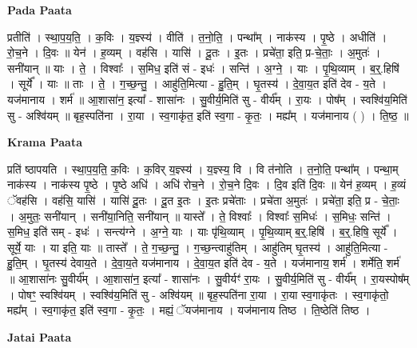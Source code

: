 \documentclass[17pt]{extarticle}
\begin{document}
\textbf{Pada Paata} \newline

प्रतीति॑ । स्था॒प॒य॒ति॒ । क॒विः । य॒ज्ञ्स्य॑ । वीति॑ । त॒नो॒ति॒ । पन्था᳚म् । नाक॑स्य । पृ॒ष्ठे । अधीति॑ । रो॒च॒ने । दि॒वः ॥ येन॑ । ह॒व्यम् । वह॑सि । यासि॑ । दू॒तः । इ॒तः । प्रचे॑ता॒ इति॒ प्र-चे॒ताः॒ । अ॒मुतः॑ । सनी॑यान् ॥ याः । ते॒ । विश्वाः᳚ । स॒मिध॒ इति॑ सं - इधः॑ । सन्ति॑ । अ॒ग्ने॒ । याः । पृ॒थि॒व्याम् । ब॒र्॒.हिषि॑ । सूर्ये᳚ । याः ॥ ताः । ते॒ । ग॒च्छ॒न्तु॒ । आहु॑ति॒मित्या - हु॒ति॒म् । घृ॒तस्य॑ । दे॒वा॒य॒त इति॑ देव - य॒ते । यज॑मानाय । शर्म॑ ॥ आ॒शासा॑न॒ इत्या᳚ - शासा॑नः । सु॒वीर्य॒मिति॑ सु - वीर्य᳚म् । रा॒यः । पोष᳚म् । स्वश्वि॑य॒मिति॑ सु - अश्वि॑यम् ॥ बृह॒स्पति॑ना । रा॒या । स्व॒गाकृ॑त॒ इति॑ स्व॒गा - कृ॒तः॒ । मह्य᳚म् । यज॑मानाय ( ) । ति॒ष्ठ॒ ॥  \newline


\textbf{Krama Paata} \newline

प्रति॑ ष्ठापयति । स्था॒प॒य॒ति॒ क॒विः । क॒विर् य॒ज्ञ्स्य॑ । 
य॒ज्ञ्स्य॒ वि । वि त॑नोति । त॒नो॒ति॒ पन्था᳚म् । पन्था॒म् नाक॑स्य । नाक॑स्य पृ॒ष्ठे । पृ॒ष्ठे अधि॑ । अधि॑ रोच॒ने । रो॒च॒ने दि॒वः । दि॒व इति॑ दि॒वः ॥ येन॑ ह॒व्यम् । ह॒व्यं ॅवह॑सि । वह॑सि॒ यासि॑ । यासि॑ दू॒तः । दू॒त इ॒तः । इ॒तः प्रचे॑ताः । प्रचे॑ता अ॒मुतः॑ । प्रचे॑ता॒ इति॒ प्र - चे॒ताः॒ । अ॒मुतः॒ सनी॑यान् । सनी॑या॒निति॒ सनी॑यान् ॥ यास्ते᳚ । ते॒ विश्वाः᳚ । विश्वाः᳚ स॒मिधः॑ । स॒मिधः॒ सन्ति॑ । स॒मिध॒ इति॑ सम् - इधः॑ । सन्त्य॑ग्ने । अ॒ग्ने॒ याः । याः पृ॑थि॒व्याम् । पृ॒थि॒व्याम् ब॒र्॒.हिषि॑ । ब॒र्॒.हिषि॒ सूर्ये᳚ । सूर्ये॒ याः । या इति॒ याः ॥ तास्ते᳚ । ते॒ ग॒च्छ॒न्तु॒ । ग॒च्छ॒न्त्वाहु॑तिम् । आहु॑तिम् घृ॒तस्य॑ । आहु॑ति॒मित्या - हु॒ति॒म् । घृ॒तस्य॑ देवाय॒ते । दे॒वा॒य॒ते यज॑मानाय । दे॒वा॒य॒त इति॑ देव - य॒ते । यज॑मानाय॒ शर्म॑ । शर्मेति॒ शर्म॑ ॥ आ॒शासा॑नः सु॒वीर्य᳚म् । आ॒शासा॑न॒ इत्या᳚ - शासा॑नः । सु॒वीर्यꣳ॑ रा॒यः । सु॒वीर्य॒मिति॑ सु - वीर्य᳚म् । रा॒यस्पोष᳚म् । पोषꣳ॒॒ स्वश्वि॑यम् । स्वश्वि॑य॒मिति॑ सु - अश्वि॑यम् ॥ बृह॒स्पति॑ना रा॒या । रा॒या स्व॒गाकृ॑तः । स्व॒गाकृ॑तो॒ मह्य᳚म् । स्व॒गाकृ॑त॒ इति॑ स्व॒गा - कृ॒तः॒ । मह्यं॒ ॅयज॑मानाय । यज॑मानाय तिष्ठ । ति॒ष्ठेति॑ तिष्ठ । \newline

\textbf{Jatai Paata} \newline
\end{document}
